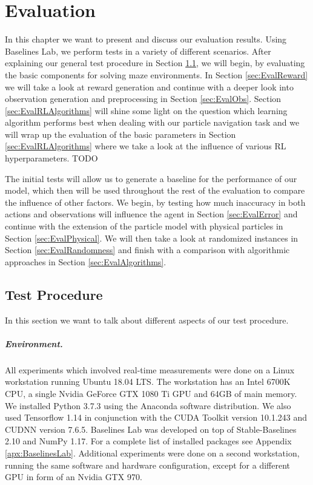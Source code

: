 \chapter{Evaluation} \label{chp:Evaluation}
In this chapter we want to present and discuss our evaluation results. Using Baselines Lab, we perform tests in a variety of different scenarios. After explaining our general test procedure in Section \ref{sec:TestProcedure}, we will begin, by evaluating the basic components for solving maze environments. In Section \ref{sec:EvalReward} we will take a look at reward generation and continue with a deeper look into observation generation and preprocessing in Section \ref{sec:EvalObs}. Section \ref{sec:EvalRLAlgorithms} will shine some light on the question which learning algorithm performs best when dealing with our particle navigation task and we will wrap up the evaluation of the basic parameters in Section \ref{sec:EvalRLAlgorithms} where we take a look at the influence of various RL hyperparameters. TODO

The initial tests will allow us to generate a baseline for the performance of our model, which then will be used throughout the rest of the evaluation to compare the influence of other factors. We begin, by testing how much inaccuracy in both actions and observations will influence the agent in Section \ref{sec:EvalError} and continue with the extension of the particle model with physical particles in Section \ref{sec:EvalPhysical}. We will then take a look at randomized instances in Section \ref{sec:EvalRandomness} and finish with a comparison with algorithmic approaches in Section \ref{sec:EvalAlgorithms}.


\section{Test Procedure} \label{sec:TestProcedure}
In this section we want to talk about different aspects of our test procedure.

\paragraph{Environment.}
All experiments which involved real-time measurements were done on a Linux workstation running Ubuntu 18.04 LTS. The workstation has an Intel 6700K CPU, a single Nvidia GeForce GTX 1080 Ti GPU and 64GB of main memory. We installed Python 3.7.3 using the Anaconda \cite{anaconda} software distribution. We also used Tensorflow 1.14 in conjunction with the CUDA Toolkit version 10.1.243 and CUDNN version 7.6.5. Baselines Lab was developed on top of Stable-Baselines 2.10 and NumPy 1.17. For a complete list of installed packages see Appendix \ref{apx:BaselinesLab}. Additional experiments were done on a second workstation, running the same software and hardware configuration, except for a different GPU in form of an Nvidia GTX 970.

